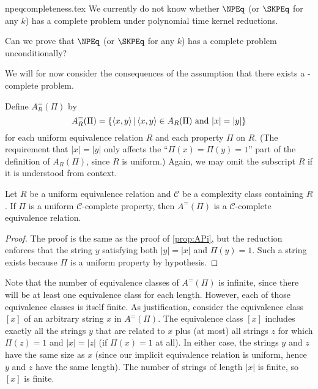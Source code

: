 \begin{filecontents}{npeqcompleteness.tex}
We currently do not know whether $\NPEq$ (or $\SKPEq$ for any $k$) has a complete problem under polynomial time kernel reductions.
\begin{openquestion}
  Can we prove that $\NPEq$ (or $\SKPEq$ for any $k$) has a complete problem unconditionally?
\end{openquestion}

We will for now consider the consequences of the assumption that there exists a \CEq-complete problem.

Define $A_R^=(\Pi)$ by
\begin{displaymath}
  A_R^=(\Pi) = \lb \pair{x}{y} \st \pair{x}{y}\in A_R(\Pi) \plain{and} |x| = |y|\rb
\end{displaymath}
for each uniform equivalence relation $R$ and each property $\Pi$ on $R$.
(The requirement that $|x| = |y|$ only affects the ``$\Pi(x) = \Pi(y) = 1$'' part of the definition of $A_R(\Pi)$, since $R$ is uniform.)
Again, we may omit the subscript $R$ if it is understood from context.

\begin{proposition}\label{prop:APieq}
  Let $R$ be a uniform equivalence relation and $\mathcal{C}$ be a complexity class containing $R$.
  If $\Pi$ is a uniform $\mathcal{C}$-complete property, then $A^=(\Pi)$ is a $\mathcal{C}$-complete equivalence relation.
\end{proposition}
\begin{proof}
  The proof is the same as the proof of \ref{prop:APi}, but the reduction enforces that the string $y$ satisfying both $|y| = |x|$ and $\Pi(y) = 1$.
  Such a string exists because $\Pi$ is a uniform property by hypothesis.
\end{proof}

Note that the number of equivalence classes of $A^=(\Pi)$ is infinite, since there will be at least one equivalence class for each length.
However, each of those equivalence classes is itself finite.
As justification, consider the equivalence class $[x]$ of an arbitrary string $x$ in $A^=(\Pi)$.
The equivalence class $[x]$ includes exactly all the strings $y$ that are related to $x$ plus (at most) all strings $z$ for which $\Pi(z) = 1$ and $|x| = |z|$ (if $\Pi(x) = 1$ at all).
In either case, the strings $y$ and $z$ have the same size as $x$ (since our implicit equivalence relation is uniform, hence $y$ and $z$ have the same length).
The number of strings of length $|x|$ is finite, so $[x]$ is finite.


\end{filecontents}

